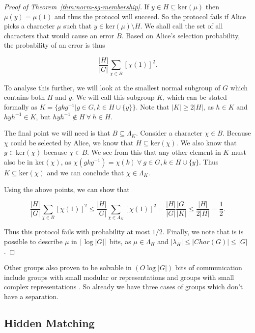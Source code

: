\documentclass[a4paper]{article}
\begin{document}
        \begin{proof}[Proof of Theorem~\ref{thm:norm-sg-membership}]
        If $y \in H \subseteq \textrm{ker}(\mu)$ then $\mu(y) = \mu(1)$ and thus the protocol will succeed. So the protocol fails if Alice picks a character $\mu$ such that $y \in \textrm{ker}(\mu) \setminus H$. We shall call the set of all characters that would cause an error $B$. Based on Alice's selection probability, the probability of an error is thus

        $$\frac{|H|}{|G|}\sum_{\chi \in B}[\chi(1)]^2.$$

        To analyse this further, we will look at the smallest normal subgroup of $G$ which contains both $H$ and $y$. We will call this subgroup $K$, which can be stated formally as $K = \{gkg^{-1}|g \in G, k \in H \cup \{y\}\}$. Note that $|K| \geq 2|H|$, as $h \in K$ and $hyh^{-1} \in K$, but $hyh^{-1} \notin H ~\forall~h\in H$.

        The final point we will need is that $B \subseteq \Lambda_K$. Consider a character $\chi \in B$. Because $\chi$ could be selected by Alice, we know that $H \subseteq \textrm{ker}(\chi)$. We also know that $y \in \textrm{ker}(\chi)$ because $\chi \in B$. We see from this that any other element in $K$ must also be in $\textrm{ker}(\chi)$, as $\chi(gkg^{-1}) = \chi(k)~\forall~g\in G, k\in H \cup \{y\}$. Thus $K \subseteq \textrm{ker}(\chi)$ and we can conclude that $\chi \in \Lambda_K$.

        Using the above points, we can show that

        $$\frac{|H|}{|G|}\sum_{\chi \in B}[\chi(1)]^2 \leq \frac{|H|}{|G|}\sum_{\chi \in \Lambda_K}[\chi(1)]^2 = \frac{|H|}{|G|}\frac{|G|}{|K|} \leq \frac{|H|}{2|H|} = \frac{1}{2}.$$

        Thus this protocol fails with probability at most $1/2$. Finally, we note that is is possible to describe $\mu$ in $\lceil\log|G|\rceil$ bits, as $\mu \in \Lambda_H$ and $|\lambda_H| \leq |Char(G)| \leq |G|$.
        \end{proof}

        Other groups also proven to be solvable in $(O\log|G|)$ bits of communication include groups with small modular or representations and groups with small complex representations \cite{0902.3175}. So already we have three cases of groups which don't have a separation.

        \subsection{Hidden Matching}
        \label{sec:hidden-matching}
\end{document}
